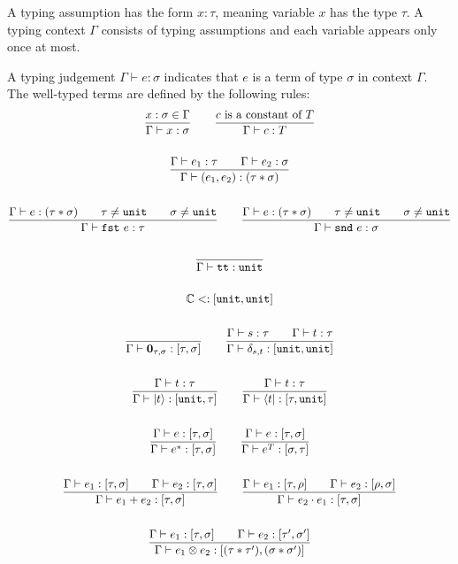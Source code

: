 \begin{definition}
  A typing assumption has the form $x : \tau$, meaning variable $x$ has the type $\tau$. A typing context $\Gamma$ consists of typing assumptions and each variable appears only once at most.

  A typing judgement $\Gamma \vdash e : \sigma$ indicates that $e$ is a term of type $\sigma$ in context $\Gamma$. The well-typed terms are defined by the following rules:
  \begin{gather*}
    \frac{x : \sigma \in \Gamma}{\Gamma \vdash x : \sigma}
    \qquad \frac{c\ \textrm{is a constant of}\ T}{\Gamma \vdash c : T}\\
    \\
    \frac{\Gamma \vdash e_1 : \tau \qquad \Gamma \vdash e_2 : \sigma}{\Gamma \vdash (e_1, e_2) : ( \tau * \sigma )} \\
    \\
    \frac{\Gamma \vdash e : ( \tau * \sigma ) \qquad \tau \neq \texttt{unit} \qquad \sigma \neq \texttt{unit}}{\Gamma \vdash \texttt{fst}\ e : \tau}
    \qquad
    \frac{\Gamma \vdash e : ( \tau * \sigma ) \qquad \tau \neq \texttt{unit} \qquad \sigma \neq \texttt{unit}}{\Gamma \vdash \texttt{snd}\ e : \sigma} \\
    \\
    \frac{}{\Gamma \vdash \texttt{tt} : \texttt{unit}}\\
    \ \\
    \mathbb{C} <: [\texttt{unit}, \texttt{unit}]\\
    \ \\
    \frac{}{\Gamma \vdash \mathbf{0}_{\tau, \sigma} : [\tau, \sigma]}
    \qquad
    \frac{\Gamma \vdash s : \tau \qquad \Gamma \vdash t : \tau}{\Gamma \vdash \delta_{s, t} : [\texttt{unit}, \texttt{unit}]}\\
    \ \\
    \frac{\Gamma \vdash t : \tau}{\Gamma \vdash |t\rangle : [\texttt{unit}, \tau]}
    \qquad 
    \frac{\Gamma \vdash t : \tau}{\Gamma \vdash \langle t| : [\tau, \texttt{unit}]}\\
    \ \\
    \frac{\Gamma \vdash e : [\tau, \sigma]}{\Gamma \vdash e^* : [\tau, \sigma]}
    \qquad
    \frac{\Gamma \vdash e : [\tau, \sigma]}{\Gamma \vdash e^T : [\sigma, \tau]} \\
    \ \\
    \frac{\Gamma \vdash e_1 : [\tau, \sigma] \qquad \Gamma \vdash e_2 : [\tau, \sigma] }{\Gamma \vdash e_1 + e_2 : [\tau, \sigma] }
    \qquad 
    \frac{\Gamma \vdash e_1 : [\tau, \rho] \qquad \Gamma \vdash e_2 : [\rho, \sigma] }{\Gamma \vdash e_2 \cdot e_1 : [\tau, \sigma] } \\
    \ \\
    \frac{\Gamma \vdash e_1 : [\tau, \sigma] \qquad \Gamma \vdash e_2 : [\tau', \sigma'] }{\Gamma \vdash e_1 \otimes e_2 : [(\tau * \tau'), (\sigma * \sigma')]}
  \end{gather*}
\end{definition}


